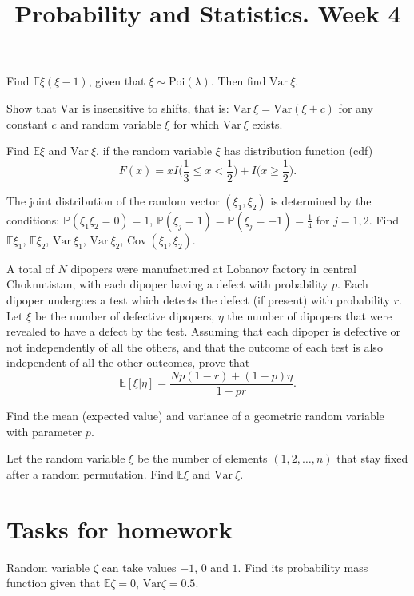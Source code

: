 \documentclass[14pt]{exam}
\title{Probability and Statistics. Week 4}
\date{}
\newcommand{\PP}{{\ensuremath{\mathbb{P}}}}
\newcommand{\EE}{{\ensuremath{\mathbb{E}}}}
\newcommand{\Var}{{\ensuremath{\textrm{Var}}}}
\begin{document}
	\maketitle
	
	
	
	\begin{questions}
		\question
		Find \(\EE \xi(\xi-1)\), given that \(\xi\sim \textrm{Poi}(\lambda)\). Then find \(\Var\ \xi\). 



		\question
		Show that \(\Var\) is insensitive to shifts, that is: \(\Var\ \xi = \Var(\xi +c)\) for any constant \(c\) and random variable \(\xi\) for which \(\Var\ \xi\) exists.


		\question
		Find \(\EE\xi\) and \(\Var\ \xi\), if the random variable \(\xi\) has distribution function (cdf) \[ F(x) = x I\big(\frac{1}{3}\leq x < \frac{1}{2}\big) + 
I\big(x \geq \frac{1}{2}\big). \]


		\question
  		The joint distribution of the random vector \((\xi_1,\xi_2)\) is determined by the conditions: \(\PP(\xi_1 \xi_2 =0) = 1\), \(\PP(\xi_j=1)=\PP(\xi_j=-1) = \frac{1}{4}\) for \(j=1,2\).  Find \(\EE\xi_1\), \(\EE\xi_2\), \(\Var\ \xi_1\), \(\Var\ \xi_2\), \(\textrm{Cov}\ (\xi_1,\xi_2)\).

		\question
		A total of \(N\) dipopers were manufactured at Lobanov factory in central Choknutistan, with each dipoper having a defect with probability \(p\). Each dipoper undergoes a test which detects the defect (if present) with probability \(r\). Let \(\xi\) be the number of defective
dipopers, \(\eta\) the number of dipopers that were revealed to have a defect by the test. Assuming that each dipoper is defective or not independently of all the others, and that the outcome of each test is also independent of all the other outcomes, prove that \[ \EE[\xi | \eta] = \frac{Np(1-r)+(1-p)\eta}{1-pr}. \]


		\question
		Find the mean (expected value) and variance of a geometric random variable with parameter \(p\).


		\question
		Let the random variable \(\xi\) be the number of elements \((1,2,\ldots,n)\) that stay fixed after a random permutation. Find \(\EE\xi\) and \(\Var\ \xi\).	
	
	\section*{Tasks for homework}
		\question
		Random variable $\zeta$ can take values $-1$, $0$ and $1$. Find its probability mass function given that $\EE\zeta = 0$, $\Var \zeta = 0.5$.
		






\end{questions}
\end{document}
